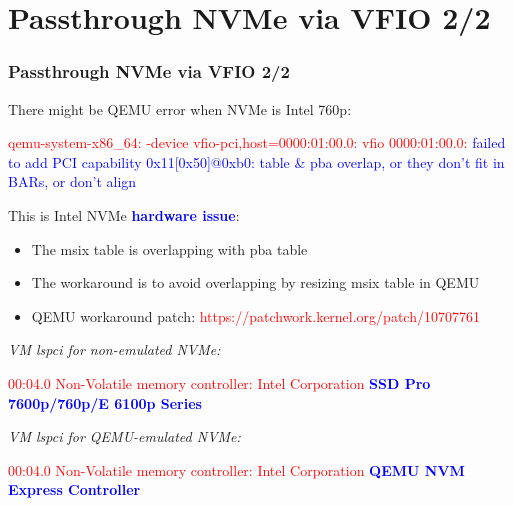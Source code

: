 \documentclass[aspectratio=169]{beamer}
\begin{document}
\section{Passthrough NVMe via VFIO 2/2}
\begin{frame}
\frametitle{Passthrough NVMe via VFIO 2/2}
\begin{block}{}
There might be QEMU error when NVMe is Intel 760p:

\textcolor{red}{qemu-system-x86\_64: -device vfio-pci,host=0000:01:00.0: vfio 0000:01:00.0:} \textcolor{blue}{failed to add PCI capability 0x11[0x50]@0xb0: table \& pba overlap, or they don't fit in BARs, or don't align} \newline

This is Intel NVMe \textbf{\textcolor{blue}{hardware issue}}:
\begin{itemize}
\item The msix table is overlapping with pba table
\item The workaround is to avoid overlapping by resizing msix table in QEMU
\item QEMU workaround patch: \textcolor{red}{https://patchwork.kernel.org/patch/10707761}
\end{itemize}
\end{block}
\begin{block}{}
\small
\textit{VM lspci for non-emulated NVMe:}

\textcolor{red}{00:04.0 Non-Volatile memory controller: Intel Corporation \textbf{\textcolor{blue}{SSD Pro 7600p/760p/E 6100p Series}}}

\vspace{2 mm}

\textit{VM lspci for QEMU-emulated NVMe:}

\textcolor{red}{00:04.0 Non-Volatile memory controller: Intel Corporation \textbf{\textcolor{blue}{QEMU NVM Express Controller}}}
\end{block}
\end{frame}

\end{document}
